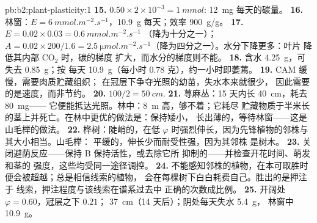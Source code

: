 \begin{solution}{pb:b2:plant-plasticity:1}
\textbf{15.} $0.50\times 2\times 10^{-3} = \qty{1}{mmol}$: \qty{12}{mg}
每天的碳量。
\textbf{16.} 林窗：$E = \qty{6}{mmol.m^{-2}.s^{-1}}$，\qty{10.9}{g}
每天；效率 \qty{900}{g/g}。
\textbf{17.} $E = 0.02\times 0.03 = \qty{0.6}{mmol.m^{-2}.s^{-1}}$
（降为十分之一）；$A = 0.02\times 200/1.6 = \qty{2.5}{\micro
mol.m^{-2}.s^{-1}}$（降为四分之一）。水分下降更多：叶片
降低其内部 $\mathrm{CO_2}$ 时，碳的梯度
扩大，而水分的梯度则不能。
\textbf{18.} 含水 \qty{4.25}{g}，可失去 \qty{0.85}{g}；按
每天 \qty{10.9}{g}（每小时 $0.78$ 克），约一小时即萎蔫。
\textbf{19.} CAM 缓慢，需要肉质贮藏组织；
在冠层下争夺光照的幼苗，失水本来就很少，
因此需要的是速度，而非节约。
\textbf{20.} $100/2 = \qty{50}{cm}$.
\textbf{21.} 荨麻丛：15 天内长 \qty{40}{cm}，耗去 \qty{80}{mg}——
它便能抵达光照。林中：\qty{8}{m} 高，够不着；它耗尽
贮藏物质于半米长的茎上并死亡。在林中更优的做法是：保持矮小，
长出薄的，等待林窗——这是山毛榉的做法。
\textbf{22.} 桦树：陡峭的，在低
$\varphi$ 时强烈伸长，因为先锋植物的邻株与其大小相当。山毛榉：
平缓的，伸长少而耐受性强，因为其邻株
是树木。
\textbf{23.} 关闭避荫反应——保持
 B 保持活性，或去除它所
抑制的——并检查开花时间、萌发和茎的
强度，这些均受同一途径调控。
\textbf{24.} 不能感知邻株的植物，在本可取胜时
便会被超越；总是相信线索的植物，
会在每棵树下白白耗费自己。胜出的是押注于
线索，押注程度与该线索在谱系过去中
正确的次数成比例。
\textbf{25.} 开阔处 $\varphi = 0.60$，冠层之下 $0.21$；
\qty{37}{cm}（14 天后）；阴处每天失水 \qty{5.4}{g}，
林窗中 \qty{10.9}{g}。
\end{solution}
